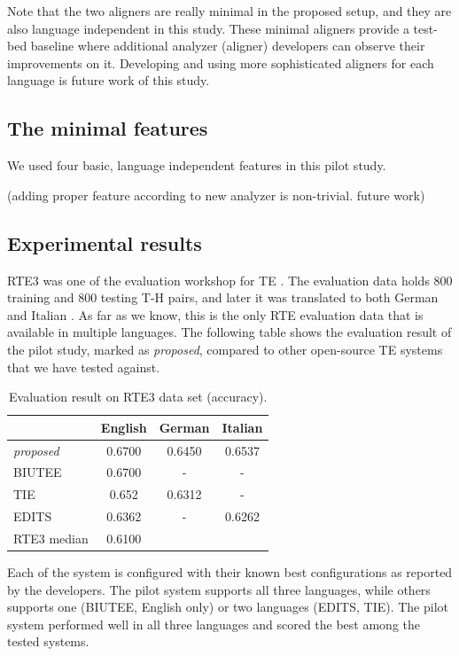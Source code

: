 \documentclass[11pt,letterpaper]{article}
\begin{document}
Note that the two aligners are really minimal in the proposed setup,
and they are also language independent in this study. These minimal
aligners provide a test-bed baseline where additional analyzer
(aligner) developers can observe their improvements on it. 
Developing and using more sophisticated aligners for each language is
future work of this study. 

\subsection{The minimal features} 
We used four basic, language independent features in this pilot
study.

(adding proper feature according to new analyzer is
non-trivial. future work) 


\subsection{Experimental results} 
RTE3 was one of the evaluation workshop for TE \cite{}. The evaluation
data holds 800 training and 800 testing T-H pairs, and later it was
translated to both German and Italian \cite{}. As far as we know, this
is the only RTE evaluation data that is available in multiple
languages. The following table shows the evaluation result of the
pilot study, marked as {\em proposed}, compared to other open-source
TE systems that we have tested against. 

\begin{table}[t!]
\centering
\small
\begin{tabular}{l|ccc}
          &   English   &   German   &   Italian \\
\hline
{\em proposed}&   0.6700      &   0.6450    &  0.6537  \\
BIUTEE        &   0.6700      &     -       &     -    \\
TIE           &   0.652       &   0.6312    &     -    \\ 
EDITS         &   0.6362      &     -       &  0.6262  \\
RTE3 median   &   0.6100      &             &          \\

\end{tabular}
\caption{Evaluation result on RTE3 data set (accuracy).}
\label{table:rte3}
\end{table}

Each of the system is configured with their known best configurations
as reported by the developers. The pilot system supports all three
languages, while others supports one (BIUTEE, English only) or two
languages (EDITS, TIE). The pilot system performed well in all
three languages and scored the best among the tested systems.
\end{document}
